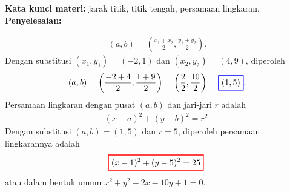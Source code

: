 \documentclass[10pt,openany,a4paper]{article}
\theoremstyle{definition}
\theoremstyle{definition}
\theoremstyle{plain}
\newenvironment{jawab}[2][tes]{%
\par\noindent\textbf{Kata kunci materi:} #1.\\
\textbf{Penyelesaian:} #2%
}{}
\begin{document}
\begin{enumerate}
\begin{jawab}[jarak titik, titik tengah, persamaan lingkaran]
{\begin{enumerate}
            \begin{align*}
                (a,b) = \left(\frac{x_1+x_2}{2},\frac{y_1+y_2}{2}\right).
            \end{align*}
            Dengan substitusi $(x_1,y_1)=(-2,1)$ dan $(x_2,y_2)=(4,9)$, diperoleh
            \begin{align*}
                (a,b) = \left(\frac{-2+4}{2}, \frac{1+9}{2}\right) = \left(\frac{2}{2}, \frac{10}{2}\right) = \colorlet{oldcolor}{.}
        \color{blue}
        \setlength{\fboxrule}{1pt} \boxed{\color{oldcolor}(1,5)}\color{oldcolor}.
            \end{align*}
            Persamaan lingkaran dengan pusat $(a,b)$ dan jari-jari $r$ adalah
            \begin{align*}
                (x-a)^2 + (y-b)^2 = r^2.
            \end{align*}
            Dengan substitusi $(a,b)=(1,5)$ dan $r=5$, diperoleh persamaan lingkarannya adalah
            $$\colorlet{oldcolor}{.}
        \color{red}
        \setlength{\fboxrule}{1pt} \boxed{\color{oldcolor}(x-1)^2 + (y-5)^2 = 25}\color{oldcolor}.$$
            atau dalam bentuk umum $x^2+y^2-2x-10y+1=0$.
        \end{enumerate}
    }
    \end{jawab}


\end{enumerate}
\end{document}
